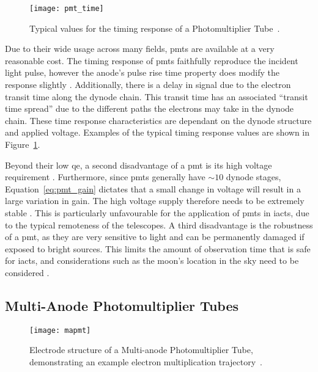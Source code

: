 \begin{figure}
	\centering
    \texttt{[image: pmt\_time]} 
	\caption[Photomultiplier Tube timing characteristics.]{Typical values for the timing response of a Photomultiplier Tube~\cite{Hamamatsu2016}.}
	\label{fig:pmt_time}
\end{figure}

Due to their wide usage across many fields, \glspl{pmt} are available at a very reasonable cost. The timing response of \glspl{pmt} faithfully reproduce the incident light pulse, however the anode's pulse rise time property does modify the response slightly \cite{Hamamatsu2016}. Additionally, there is a delay in signal due to the electron transit time along the dynode chain. This transit time has an associated ``transit time spread'' due to the different paths the electrons may take in the dynode chain. These time response characteristics are dependant on the dynode structure and applied voltage. Examples of the typical timing response values are shown in Figure~\ref{fig:pmt_time}.

Beyond their low \gls{qe}, a second disadvantage of a \gls{pmt} is its high voltage requirement \cite{Weekes2003}. Furthermore, since \glspl{pmt} generally have $\sim 10$ dynode stages, Equation~\ref{eq:pmt_gain} dictates that a small change in voltage will result in a large variation in gain. The high voltage supply therefore needs to be extremely stable \cite{Hamamatsu2016}. This is particularly unfavourable for the application of \glspl{pmt} in \glspl{iact}, due to the typical remoteness of the telescopes. A third disadvantage is the robustness of a \gls{pmt}, as they are very sensitive to light and can be permanently damaged if exposed to bright sources. This limits the amount of observation time that is safe for \glspl{iact}, and considerations such as the moon's location in the sky need to be considered \cite{Knoetig2013}.

\subsection{Multi-Anode Photomultiplier Tubes}

\begin{figure}
	\centering
    \texttt{[image: mapmt]} 
	\caption[Internals of a Multi-anode Photomultiplier Tube.]{Electrode structure of a Multi-anode Photomultiplier Tube, demonstrating an example electron multiplication trajectory~\cite{HAMAMATSU2007}.}
	\label{fig:mapmt}
\end{figure}

